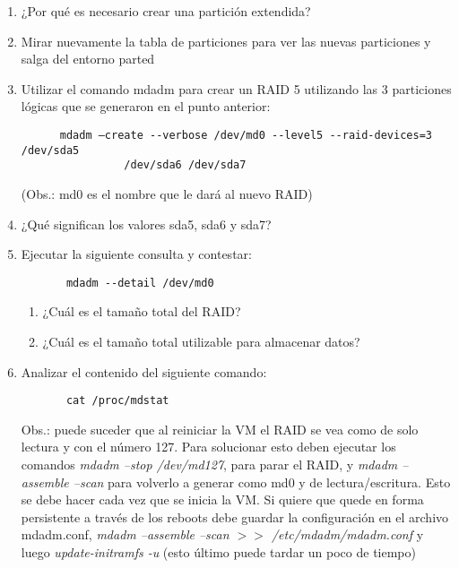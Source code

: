 \begin{enumerate}
 \item ¿Por qué es necesario crear una partición extendida?  
 \item Mirar nuevamente la tabla de particiones para ver las nuevas particiones y salga del entorno parted
 \item  Utilizar el comando mdadm para crear un RAID 5 utilizando las 3 particiones lógicas que se generaron en el punto anterior:
    \begin{verbatim}
      mdadm –create --verbose /dev/md0 --level5 --raid-devices=3 /dev/sda5 
                /dev/sda6 /dev/sda7
    \end{verbatim}
   (Obs.: md0 es el nombre que le dará al nuevo RAID)
 \item ¿Qué significan los valores sda5, sda6 y sda7? 
 \item Ejecutar la siguiente consulta y contestar:
   \begin{verbatim}
       mdadm --detail /dev/md0
   \end{verbatim}
 \begin{enumerate}
  \item ¿Cuál es el tamaño total del RAID?
  \item ¿Cuál es el tamaño total utilizable para almacenar datos?
 \end{enumerate}
 \item Analizar el contenido del siguiente comando:
   \begin{verbatim}
       cat /proc/mdstat
   \end{verbatim} 
 Obs.: puede suceder que al reiniciar la VM el RAID se vea como de solo lectura y con el número 127. Para solucionar esto deben
  ejecutar los comandos {\it mdadm --stop /dev/md127}, para parar el RAID, y {\it mdadm --assemble --scan} para volverlo a generar
  como md0 y de lectura/escritura. Esto se debe hacer cada vez que se inicia la VM. Si quiere que quede en forma persistente a 
  través de los reboots debe guardar la configuración en el archivo mdadm.conf, {\it mdadm --assemble --scan $>>$ /etc/mdadm/mdadm.conf}
  y luego {\it update-initramfs -u} (esto último puede tardar un poco de tiempo)


\end{enumerate}
